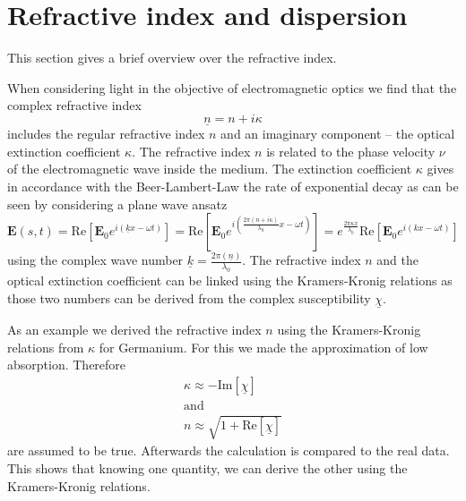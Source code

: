 \section{Refractive index and dispersion}
\label{sec:dispersion}

This section gives a brief overview over the refractive index.

When considering light in the objective of electromagnetic optics we find that the complex refractive index
\begin{equation}
    \underline{n} = n + i \kappa \label{eq:refindex}
\end{equation}
includes the  regular refractive index  $n$ and an imaginary component -- the optical extinction coefficient
 $\kappa$. The refractive index $n$ is related to the 
phase velocity $\nu$ of the electromagnetic wave inside the medium. The extinction coefficient $\kappa$ gives 
in accordance with the Beer-Lambert-Law the rate of exponential decay as can be seen
by considering a plane wave ansatz
\begin{equation}
    \mathbf{E}(s,t) = \mathrm{Re}[ \mathbf{E}_{0} e^{i( \underline{k} x-\omega t)}]  = 
    \mathrm{Re}[ \mathbf{E}_{0} e^{i( \frac{2 \pi (n + i \kappa)}{\lambda_0} x-\omega t)}] =
    e^{\frac{2 \pi \kappa x}{\lambda_0}}\mathrm{Re}[ \mathbf{E}_{0} e^{i( k x-\omega t)}]
\end{equation}
using the complex wave number $\underline{k} = \frac{2 \pi (\underline{n})}{\lambda_0}$. The refractive index $n$
and the optical extinction coefficient can be linked using the Kramers-Kronig relations as those two numbers can be 
derived from the complex susceptibility $\underline{\chi}$.

As an example we derived the refractive index $n$ using the Kramers-Kronig relations from $\kappa$ for Germanium. For this we made the
approximation of low absorption. Therefore 
\begin{gather*}
    \kappa \approx - \mathrm{Im}[\underline{\chi}]\\
    \mathrm{and}\\
    n \approx \sqrt{1 + \mathrm{Re}[\underline{\chi}]}
\end{gather*}
are assumed to be true. Afterwards the calculation is compared to the real data. This shows that knowing one quantity, we can derive the other using the Kramers-Kronig relations.


